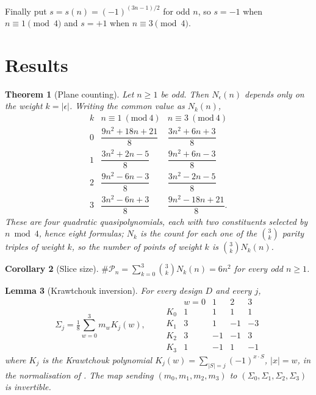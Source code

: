 \documentclass[11pt]{amsart}
\newtheorem{theorem}{Theorem}[section]
\newtheorem{lemma}[theorem]{Lemma}
\newtheorem{corollary}[theorem]{Corollary}
\theoremstyle{definition}
\theoremstyle{remark}
\begin{document}
Finally put $s = s(n) = (-1)^{(3n-1)/2}$ for odd $n$, so $s = -1$ when $n \equiv 1 \pmod 4$ and $s = +1$ when $n \equiv 3 \pmod 4$.

\section{Results}
\label{sec:res}

\begin{theorem}[Plane counting]
\label{thm:count}
Let $n \ge 1$ be odd. Then $N_\epsilon(n)$ depends only on the weight $k = |\epsilon|$. Writing the common value as $N_k(n)$,
\[
\begin{array}{c|cc}
 k & n\equiv1\ (\mathrm{mod}\ 4) & n\equiv3\ (\mathrm{mod}\ 4)\\ \hline
0&\dfrac{9n^2+18n+21}{8}&\dfrac{3n^2+6n+3}{8}\\[6pt]
1&\dfrac{3n^2+2n-5}{8}&\dfrac{9n^2+6n-3}{8}\\[6pt]
2&\dfrac{9n^2-6n-3}{8}&\dfrac{3n^2-2n-5}{8}\\[6pt]
3&\dfrac{3n^2-6n+3}{8}&\dfrac{9n^2-18n+21}{8}.
\end{array}
\]
These are four quadratic quasipolynomials, each with two constituents selected by $n \bmod 4$, hence eight formulas; $N_k$ is the count for \emph{each one} of the $\binom3k$ parity triples of weight $k$, so the number of points of weight $k$ is $\binom3k N_k(n)$.
\end{theorem}

\begin{corollary}[Slice size]
\label{cor:size}
$\#\mathcal{P}_n = \sum_{k=0}^{3}\binom3k N_k(n) = 6n^2$ for every odd $n \ge 1$.
\end{corollary}

\begin{lemma}[Krawtchouk inversion]
\label{lem:kraw}
For every design $D$ and every $j$,
\[
\Sigma_j = \tfrac18 \sum_{w=0}^{3} m_w K_j(w),
\qquad
\begin{array}{c|cccc}
 & w=0 & 1 & 2 & 3\\ \hline
K_0 & 1 & 1 & 1 & 1\\
K_1 & 3 & 1 & -1 & -3\\
K_2 & 3 & -1 & -1 & 3\\
K_3 & 1 & -1 & 1 & -1
\end{array}
\]
where $K_j$ is the Krawtchouk polynomial $K_j(w) = \sum_{|S|=j} (-1)^{x \cdot S}$, $|x| = w$, in the normalisation of \cite[Ch.~5]{macwilliams}. The map sending $(m_0,m_1,m_2,m_3)$ to $(\Sigma_0,\Sigma_1,\Sigma_2,\Sigma_3)$ is invertible.
\end{lemma}
\end{document}
